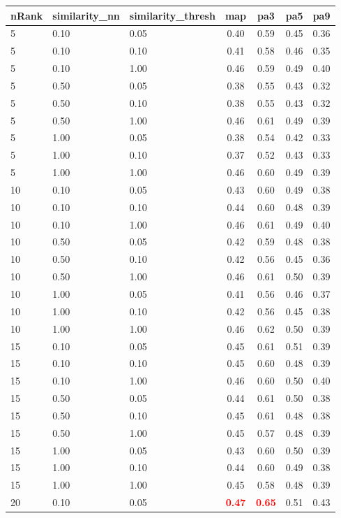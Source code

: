 \begin{tabular}{lllcccc} 
nRank & similarity\_nn & similarity\_thresh & map & pa3 & pa5 & pa9 \\ 
\hline 
 5 & 0.10 & 0.05 & 0.40 & 0.59 & 0.45 & 0.36 \\ 
 5 & 0.10 & 0.10 & 0.41 & 0.58 & 0.46 & 0.35 \\ 
 5 & 0.10 & 1.00 & 0.46 & 0.59 & 0.49 & 0.40 \\ 
 5 & 0.50 & 0.05 & 0.38 & 0.55 & 0.43 & 0.32 \\ 
 5 & 0.50 & 0.10 & 0.38 & 0.55 & 0.43 & 0.32 \\ 
 5 & 0.50 & 1.00 & 0.46 & 0.61 & 0.49 & 0.39 \\ 
 5 & 1.00 & 0.05 & 0.38 & 0.54 & 0.42 & 0.33 \\ 
 5 & 1.00 & 0.10 & 0.37 & 0.52 & 0.43 & 0.33 \\ 
 5 & 1.00 & 1.00 & 0.46 & 0.60 & 0.49 & 0.39 \\ 
10 & 0.10 & 0.05 & 0.43 & 0.60 & 0.49 & 0.38 \\ 
10 & 0.10 & 0.10 & 0.44 & 0.60 & 0.48 & 0.39 \\ 
10 & 0.10 & 1.00 & 0.46 & 0.61 & 0.49 & 0.40 \\ 
10 & 0.50 & 0.05 & 0.42 & 0.59 & 0.48 & 0.38 \\ 
10 & 0.50 & 0.10 & 0.42 & 0.56 & 0.45 & 0.36 \\ 
10 & 0.50 & 1.00 & 0.46 & 0.61 & 0.50 & 0.39 \\ 
10 & 1.00 & 0.05 & 0.41 & 0.56 & 0.46 & 0.37 \\ 
10 & 1.00 & 0.10 & 0.42 & 0.56 & 0.45 & 0.38 \\ 
10 & 1.00 & 1.00 & 0.46 & 0.62 & 0.50 & 0.39 \\ 
15 & 0.10 & 0.05 & 0.45 & 0.61 & 0.51 & 0.39 \\ 
15 & 0.10 & 0.10 & 0.45 & 0.60 & 0.48 & 0.39 \\ 
15 & 0.10 & 1.00 & 0.46 & 0.60 & 0.50 & 0.40 \\ 
15 & 0.50 & 0.05 & 0.44 & 0.61 & 0.50 & 0.38 \\ 
15 & 0.50 & 0.10 & 0.45 & 0.61 & 0.48 & 0.38 \\ 
15 & 0.50 & 1.00 & 0.45 & 0.57 & 0.48 & 0.39 \\ 
15 & 1.00 & 0.05 & 0.43 & 0.60 & 0.50 & 0.39 \\ 
15 & 1.00 & 0.10 & 0.44 & 0.60 & 0.49 & 0.38 \\ 
15 & 1.00 & 1.00 & 0.45 & 0.58 & 0.48 & 0.39 \\ 
20 & 0.10 & 0.05 & \textbf{\textcolor{red}{0.47}} & \textbf{\textcolor{red}{0.65}} & 0.51 & 0.43 \\ 

\end{tabular}
